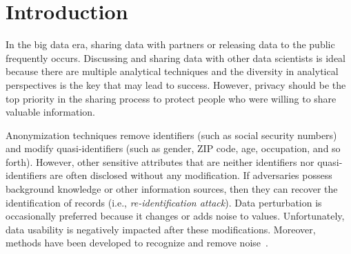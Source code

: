 \section{Introduction}
In the big data era, sharing data with partners or releasing data to the public frequently occurs. Discussing and sharing data with other data scientists is ideal because there are multiple analytical techniques and the diversity in analytical perspectives is the key that may lead to success. However, privacy should be the top priority in the sharing process to protect people who were willing to share valuable information.

Anonymization techniques remove identifiers (such as social security numbers) and modify quasi-identifiers (such as gender, ZIP code, age, occupation, and so forth). However, other sensitive attributes that are neither identifiers nor quasi-identifiers are often disclosed without any modification. If adversaries possess background knowledge or other information sources, then they can recover the identification of records (i.e., \textit{re-identification attack}). Data perturbation is occasionally preferred because it changes or adds noise to values. Unfortunately,  data usability is negatively impacted after these modifications.  Moreover,  methods have been developed to recognize and remove noise~\cite{Agrawal:2000:PDM:335191.335438}.

